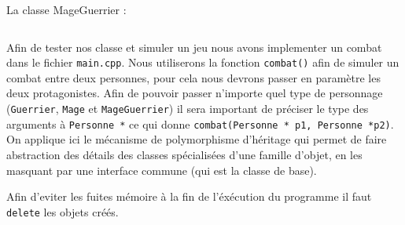 La classe MageGuerrier :
\inputminted[linenos,firstline=7,lastline=21]{cpp}{../sources/cpp/TP9-10/MageGuerrier.cpp}

Afin de tester nos classe et simuler un jeu nous avons implementer un combat dans le fichier \texttt{main.cpp}.
Nous utiliserons la fonction \texttt{combat()} afin de simuler un combat entre deux personnes, pour cela nous devrons passer en paramètre les deux protagonistes.
Afin de pouvoir passer n'importe quel type de personnage (\texttt{Guerrier}, \texttt{Mage} et \texttt{MageGuerrier}) il sera important de préciser le type des arguments à \texttt{Personne *} ce qui donne \texttt{combat(Personne * p1, Personne *p2)}.
On applique ici le mécanisme de polymorphisme d'héritage qui permet de faire abstraction des détails des classes spécialisées d'une famille d'objet, en les masquant par une interface commune (qui est la classe de base).

Afin d'eviter les fuites mémoire à la fin de l'éxécution du programme il faut \texttt{delete} les objets créés.

\inputminted[linenos,firstline=43,lastline=60]{cpp}{../sources/cpp/TP9-10/main.cpp}
